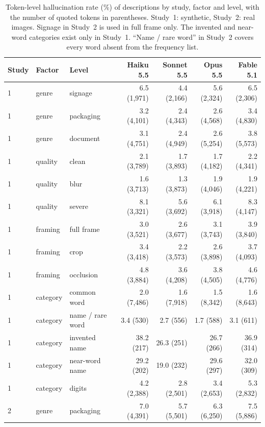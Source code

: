 \documentclass[pdflatex,sn-mathphys-num]{sn-jnl}%
\theoremstyle{thmstyleone}%
\theoremstyle{thmstyletwo}%
\theoremstyle{thmstylethree}%
\begin{document}
\begin{appendices}
\begin{table}[!tbp]
\caption{Token-level hallucination rate (\%) of descriptions by study, factor and level, with the number of quoted tokens in parentheses. Study~1: synthetic, Study~2: real images. Signage in Study~2 is used in full frame only. The invented and near-word categories exist only in Study~1. ``Name / rare word'' in Study~2 covers every word absent from the frequency list.}\label{tab:breakdown}
\footnotesize
\setlength{\tabcolsep}{3pt}
\begin{tabular*}{\textwidth}{@{\extracolsep\fill}lllrrrr}
\toprule
Study & Factor & Level & Haiku 5.5 & Sonnet 5.5 & Opus 5.5 & Fable 5.1 \\
\midrule
1 & genre & signage & 6.5 (1{,}971) & 4.4 (2{,}166) & 5.6 (2{,}324) & 6.5 (2{,}306) \\
1 & genre & packaging & 3.2 (4{,}101) & 2.4 (4{,}343) & 2.6 (4{,}568) & 3.4 (4{,}830) \\
1 & genre & document & 3.1 (4{,}751) & 2.4 (4{,}949) & 2.6 (5{,}254) & 3.8 (5{,}573) \\
1 & quality & clean & 2.1 (3{,}789) & 1.7 (3{,}893) & 1.7 (4{,}182) & 2.2 (4{,}341) \\
1 & quality & blur & 1.6 (3{,}713) & 1.3 (3{,}873) & 1.9 (4{,}046) & 1.9 (4{,}221) \\
1 & quality & severe & 8.1 (3{,}321) & 5.6 (3{,}692) & 6.1 (3{,}918) & 8.3 (4{,}147) \\
1 & framing & full frame & 3.0 (3{,}521) & 2.6 (3{,}677) & 3.1 (3{,}743) & 3.9 (3{,}840) \\
1 & framing & crop & 3.4 (3{,}418) & 2.2 (3{,}573) & 2.6 (3{,}898) & 3.7 (4{,}093) \\
1 & framing & occlusion & 4.8 (3{,}884) & 3.6 (4{,}208) & 3.8 (4{,}505) & 4.6 (4{,}776) \\
1 & category & common word & 2.0 (7{,}486) & 1.6 (7{,}918) & 1.5 (8{,}342) & 1.6 (8{,}643) \\
1 & category & name / rare word & 3.4 (530) & 2.7 (556) & 1.7 (588) & 3.1 (611) \\
1 & category & invented name & 38.2 (217) & 26.3 (251) & 26.7 (266) & 36.9 (314) \\
1 & category & near-word name & 29.2 (202) & 19.0 (232) & 29.6 (297) & 32.0 (309) \\
1 & category & digits & 4.2 (2{,}388) & 2.8 (2{,}501) & 3.4 (2{,}653) & 5.3 (2{,}832) \\
\midrule
2 & genre & packaging & 7.0 (4{,}391) & 5.7 (5{,}501) & 6.3 (6{,}250) & 7.5 (5{,}886) \\

\end{tabular*}
\end{table}
\end{appendices}
\end{document}
